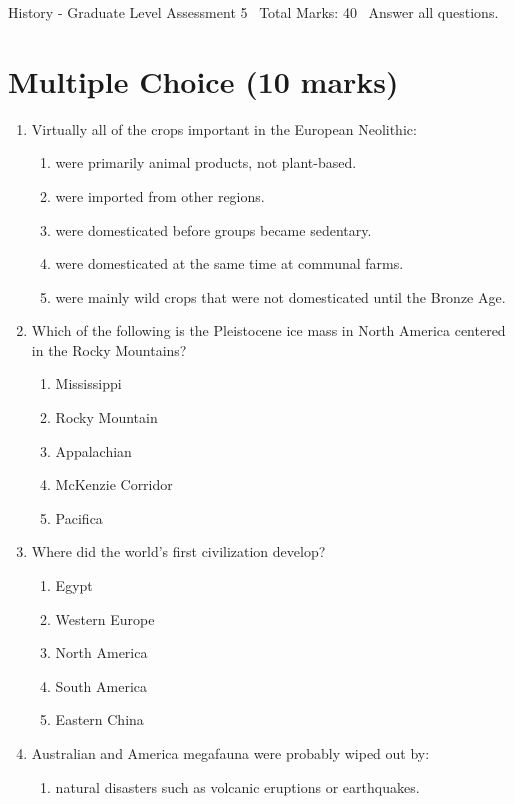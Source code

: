 \documentclass[12pt]{article}
\begin{document}
\begin{center}
History - Graduate Level Assessment 5 \
Total Marks: 40 \
Answer all questions.
\end{center}

\section*{Multiple Choice (10 marks)}
\begin{enumerate}[label=\arabic*.]
\item Virtually all of the crops important in the European Neolithic:
\begin{enumerate}[label=(\alph*)]
    \item were primarily animal products, not plant-based.
    \item were imported from other regions.
    \item were domesticated before groups became sedentary.
    \item were domesticated at the same time at communal farms.
    \item were mainly wild crops that were not domesticated until the Bronze Age.
\end{enumerate}
\item Which of the following is the Pleistocene ice mass in North America centered in the Rocky
Mountains?
\begin{enumerate}[label=(\alph*)]
    \item Mississippi
    \item Rocky Mountain
    \item Appalachian
    \item McKenzie Corridor
    \item Pacifica
\end{enumerate}
\item Where did the world's first civilization develop?
\begin{enumerate}[label=(\alph*)]
    \item Egypt
    \item Western Europe
    \item North America
    \item South America
    \item Eastern China
\end{enumerate}
\item Australian and America megafauna were probably wiped out by:
\begin{enumerate}[label=(\alph*)]
    \item natural disasters such as volcanic eruptions or earthquakes.

\end{enumerate}
\end{enumerate}
\end{document}
